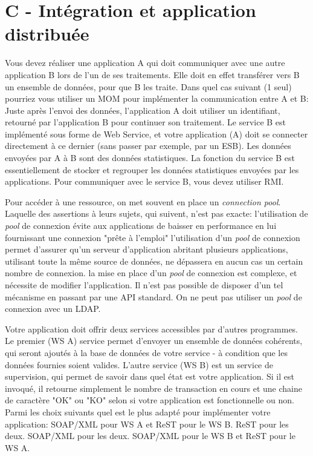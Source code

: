 \documentclass[a4paper,10pt]{article}
\begin{document}
\section{C - Intégration et application distribuée}

\begin{question}{Vous devez réaliser une application A qui doit communiquer avec une autre
application B lors de l'un de ses traitements. Elle doit en effet transférer vers B un ensemble de
données, pour que B les traite. Dans quel cas suivant (1 seul) pourriez vous utiliser un MOM pour
implémenter la communication entre A et B:}
  \false Juste après l'envoi des données, l'application A doit utiliser un identifiant, retourné par
  l'application B pour continuer son traitement.
  \false Le service B est implémenté sous forme de Web Service, et votre application (A) doit se
  connecter directement à ce dernier (sans passer par exemple, par un ESB).
  \true Les données envoyées par A à B sont des données statistiques. La fonction du service B est
  essentiellement de stocker et regrouper les données statistiques envoyées par les applications.
  \false Pour communiquer avec le service B, vous devez utiliser RMI.
\end{question}

\begin{question}{Pour accéder à une ressource, on met souvent en place un \textit{connection pool}.
Laquelle des assertions à leurs sujets, qui suivent, n'est pas exacte:}
  \false l'utilisation de \textit{pool} de connexion évite aux applications de baisser en
  performance en lui fournissant une connexion "prête à l'emploi"
  \false l'utilisation d'un \textit{pool} de connexion permet d'assurer qu'un serveur d'application
  abritant plusieurs applications, utilisant toute la même source de données, ne dépassera en aucun
  cas un certain nombre de connexion.
  \true la mise en place d'un \textit{pool} de connexion est complexe, et nécessite de modifier
  l'application. Il n'est pas possible de disposer d'un tel mécanisme en passant par une API
  standard.
  \false On ne peut pas utiliser un \textit{pool} de connexion avec un LDAP.
\end{question}

\begin{question}{Votre application doit offrir deux services accessibles par d'autres programmes. Le
premier (WS A) service permet d'envoyer un ensemble de données cohérents, qui seront ajoutés à la base de
données de votre service - à condition que les données fournies soient valides. L'autre service (WS
B) est un service de supervision, qui permet de savoir dans quel état est votre application. Si il est
invoqué, il retourne simplement le nombre de transaction en cours et une chaine de caractère "OK" ou
"KO" selon si votre application est fonctionnelle ou non. Parmi les choix suivants quel est le plus
adapté pour implémenter votre application:}
  \true SOAP/XML pour WS A et ReST pour le WS B.
  \false ReST pour les deux.
  \false SOAP/XML pour les deux.
  \false SOAP/XML pour le WS B et ReST pour le WS A.
\end{question}
\end{document}
